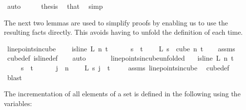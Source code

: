 \begin{isabellebody}
\ auto\isanewline
\ \ \isamarkupfalse%
\ \isamarkupfalse%
\ {\isacharquery}{\kern0pt}thesis\ \isamarkupfalse%
\ that\ \isamarkupfalse%
\ simp\isanewline
{}\isamarkupfalse%
%
\endisatagproof
{\isafoldproof}%
%
\isadelimproof
%
\endisadelimproof
%
\begin{isamarkuptext}%
The next two lemmas are used to simplify proofs by enabling us to use the resulting
facts directly. This avoids having to unfold the definition of  each
time.%
\end{isamarkuptext}\isamarkuptrue%
\isamarkupfalse%
\ line{\isacharunderscore}{\kern0pt}points{\isacharunderscore}{\kern0pt}in{\isacharunderscore}{\kern0pt}cube{\isacharcolon}{\kern0pt}\ \isanewline
\ \ \ {\isachardoublequoteopen}is{\isacharunderscore}{\kern0pt}line\ L\ n\ t{\isachardoublequoteclose}\ \isanewline
\ \ \ \ \ {\isachardoublequoteopen}s\ {\isacharless}{\kern0pt}\ t{\isachardoublequoteclose}\ \isanewline
\ \ \ {\isachardoublequoteopen}L\ s\ {\isasymin}\ cube\ n\ t{\isachardoublequoteclose}\isanewline
%
\isadelimproof
\ \ %
\endisadelimproof
%
\isatagproof
{}\isamarkupfalse%
\ assms\ \isamarkupfalse%
\ cube{\isacharunderscore}{\kern0pt}def\ is{\isacharunderscore}{\kern0pt}line{\isacharunderscore}{\kern0pt}def\isanewline
\ \ \isamarkupfalse%
\ auto%
\endisatagproof
{\isafoldproof}%
%
\isadelimproof
\ \ \ \ \ \isanewline
%
\endisadelimproof
\isanewline
{}\isamarkupfalse%
\ line{\isacharunderscore}{\kern0pt}points{\isacharunderscore}{\kern0pt}in{\isacharunderscore}{\kern0pt}cube{\isacharunderscore}{\kern0pt}unfolded{\isacharcolon}{\kern0pt}\isanewline
\ \ \ {\isachardoublequoteopen}is{\isacharunderscore}{\kern0pt}line\ L\ n\ t{\isachardoublequoteclose}\ \isanewline
\ \ \ \ \ {\isachardoublequoteopen}s\ {\isacharless}{\kern0pt}\ t{\isachardoublequoteclose}\ \isanewline
\ \ \ \ \ {\isachardoublequoteopen}j\ {\isacharless}{\kern0pt}\ n{\isachardoublequoteclose}\ \isanewline
\ \ \ {\isachardoublequoteopen}L\ s\ j\ {\isasymin}\ {\isacharbraceleft}{\kern0pt}{\isachardot}{\kern0pt}{\isachardot}{\kern0pt}{\isacharless}{\kern0pt}t{\isacharbraceright}{\kern0pt}{\isachardoublequoteclose}\ \isanewline
%
\isadelimproof
\ \ %
\endisadelimproof
%
\isatagproof
{}\isamarkupfalse%
\ assms\ line{\isacharunderscore}{\kern0pt}points{\isacharunderscore}{\kern0pt}in{\isacharunderscore}{\kern0pt}cube\ \isamarkupfalse%
\ cube{\isacharunderscore}{\kern0pt}def\ \isamarkupfalse%
\ blast%
\endisatagproof
{\isafoldproof}%
%
\isadelimproof
%
\endisadelimproof
%
\begin{isamarkuptext}%
The incrementation of all elements of a set is defined in the following using the variables:


\end{isamarkuptext}
\end{isabellebody}
